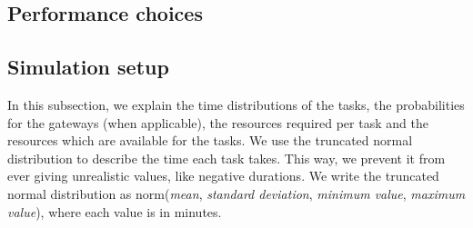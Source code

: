 
\subsection{Performance choices}

\subsection{Simulation setup}
In this subsection, we explain the time distributions of the tasks, the probabilities for the gateways (when applicable), the resources required per task and the resources which are available for the tasks. We use the truncated normal distribution to describe the time each task takes. This way, we prevent it from ever giving unrealistic values, like negative durations. We write the truncated normal distribution as norm(\textit{mean}, \textit{standard deviation}, \textit{minimum value}, \textit{maximum value}), where each value is in minutes.

